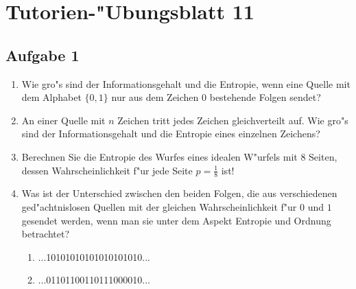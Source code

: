 \documentclass[10pt,oneside,onecolumn,a4paper,german,titlepage]{article}
\begin{document}
\section*{Tutorien-"Ubungsblatt 11}

\subsection*{Aufgabe 1}
\begin{enumerate}
\item Wie gro"s sind der Informationsgehalt und die Entropie, wenn eine Quelle mit
dem Alphabet $\{0,1\}$ nur aus dem Zeichen $0$ bestehende Folgen sendet?
\item An einer Quelle mit $n$ Zeichen tritt jedes Zeichen gleichverteilt auf. Wie
gro"s sind der Informationsgehalt und die Entropie eines einzelnen Zeichens?
\item Berechnen Sie die Entropie des Wurfes eines idealen W"urfels mit 8 Seiten,
dessen Wahrscheinlichkeit f"ur jede Seite $p = \frac{1}{8}$ ist!
\item Was ist der Unterschied zwischen den beiden Folgen, die aus verschiedenen
ged"achtnislosen Quellen mit der gleichen Wahrscheinlichkeit f"ur $0$ und $1$
gesendet werden, wenn man sie unter dem Aspekt Entropie und Ordnung betrachtet?
\begin{enumerate}
\item ...10101010101010101010...
\item ...01101100110111000010...
\end{enumerate}
\end{enumerate}
\end{document}
